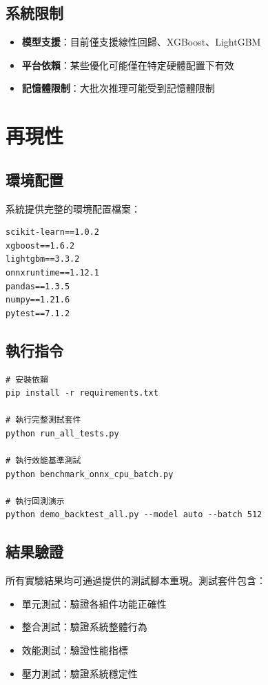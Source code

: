 \documentclass[11pt,a4paper]{article}
\begin{document}
\subsection{系統限制}

\begin{itemize}
    \item \textbf{模型支援}：目前僅支援線性回歸、XGBoost、LightGBM
    \item \textbf{平台依賴}：某些優化可能僅在特定硬體配置下有效
    \item \textbf{記憶體限制}：大批次推理可能受到記憶體限制
\end{itemize}

\section{再現性}

\subsection{環境配置}

系統提供完整的環境配置檔案：

\begin{lstlisting}[caption=requirements.txt]
scikit-learn==1.0.2
xgboost==1.6.2
lightgbm==3.3.2
onnxruntime==1.12.1
pandas==1.3.5
numpy==1.21.6
pytest==7.1.2
\end{lstlisting}

\subsection{執行指令}

\begin{lstlisting}[caption=測試執行指令]
# 安裝依賴
pip install -r requirements.txt

# 執行完整測試套件
python run_all_tests.py

# 執行效能基準測試
python benchmark_onnx_cpu_batch.py

# 執行回測演示
python demo_backtest_all.py --model auto --batch 512
\end{lstlisting}

\subsection{結果驗證}

所有實驗結果均可通過提供的測試腳本重現。測試套件包含：

\begin{itemize}
    \item 單元測試：驗證各組件功能正確性
    \item 整合測試：驗證系統整體行為
    \item 效能測試：驗證性能指標
    \item 壓力測試：驗證系統穩定性
\end{itemize}
\end{document}

